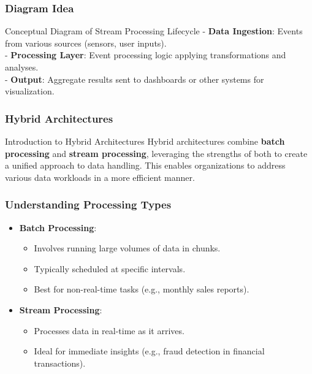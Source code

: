 \documentclass[aspectratio=169]{beamer}
\begin{document}
\begin{frame}[fragile]
    \frametitle{Diagram Idea}
    \begin{block}{Conceptual Diagram of Stream Processing Lifecycle}
        - \textbf{Data Ingestion}: Events from various sources (sensors, user inputs). \\
        - \textbf{Processing Layer}: Event processing logic applying transformations and analyses. \\
        - \textbf{Output}: Aggregate results sent to dashboards or other systems for visualization.
    \end{block}
\end{frame}

\begin{frame}[fragile]
    \frametitle{Hybrid Architectures}
    \begin{block}{Introduction to Hybrid Architectures}
        Hybrid architectures combine \textbf{batch processing} and \textbf{stream processing}, leveraging the strengths of both to create a unified approach to data handling.
        This enables organizations to address various data workloads in a more efficient manner.
    \end{block}
\end{frame}

\begin{frame}[fragile]
    \frametitle{Understanding Processing Types}
    \begin{itemize}
        \item \textbf{Batch Processing}: 
            \begin{itemize}
                \item Involves running large volumes of data in chunks.
                \item Typically scheduled at specific intervals.
                \item Best for non-real-time tasks (e.g., monthly sales reports).
            \end{itemize}
        \item \textbf{Stream Processing}:
            \begin{itemize}
                \item Processes data in real-time as it arrives.
                \item Ideal for immediate insights (e.g., fraud detection in financial transactions).
            \end{itemize}
    \end{itemize}
\end{frame}
\end{document}
